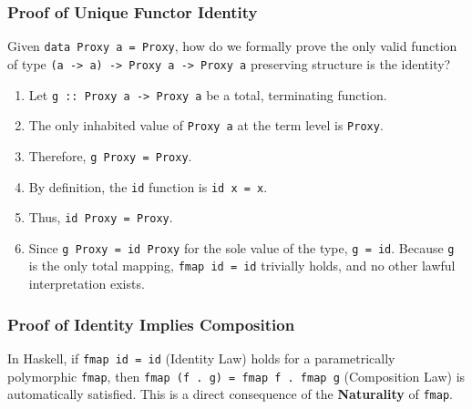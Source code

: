\documentclass[
]{article}
\providecommand{\tightlist}{%
  \setlength{\itemsep}{0pt}\setlength{\parskip}{0pt}}
\begin{document}
\subsubsection{Proof of Unique Functor
Identity}\label{proof-of-unique-functor-identity}

Given \texttt{data\ Proxy\ a\ =\ Proxy}, how do we formally prove the
only valid function of type
\texttt{(a\ -\textgreater{}\ a)\ -\textgreater{}\ Proxy\ a\ -\textgreater{}\ Proxy\ a}
preserving structure is the identity?

\begin{enumerate}
\def\labelenumi{\arabic{enumi}.}
\tightlist
\item
  Let \texttt{g\ ::\ Proxy\ a\ -\textgreater{}\ Proxy\ a} be a total,
  terminating function.
\item
  The only inhabited value of \texttt{Proxy\ a} at the term level is
  \texttt{Proxy}.
\item
  Therefore, \texttt{g\ Proxy\ =\ Proxy}.
\item
  By definition, the \texttt{id} function is \texttt{id\ x\ =\ x}.
\item
  Thus, \texttt{id\ Proxy\ =\ Proxy}.
\item
  Since \texttt{g\ Proxy\ =\ id\ Proxy} for the sole value of the type,
  \texttt{g\ =\ id}. Because \texttt{g} is the only total mapping,
  \texttt{fmap\ id\ =\ id} trivially holds, and no other lawful
  interpretation exists.
\end{enumerate}

\subsubsection{Proof of Identity Implies
Composition}\label{proof-of-identity-implies-composition}

In Haskell, if \texttt{fmap\ id\ =\ id} (Identity Law) holds for a
parametrically polymorphic \texttt{fmap}, then
\texttt{fmap\ (f\ .\ g)\ =\ fmap\ f\ .\ fmap\ g} (Composition Law) is
automatically satisfied. This is a direct consequence of the
\textbf{Naturality} of \texttt{fmap}.
\end{document}
